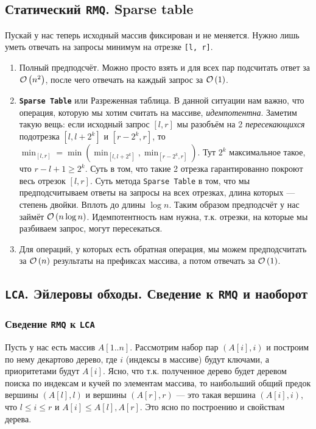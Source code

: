 \subsection{Статический \texttt{RMQ}. Sparse table}
Пускай у нас теперь исходный массив фиксирован и не меняется. Нужно лишь уметь отвечать на запросы минимум на отрезке \texttt{[l, r]}.
\begin{enumerate}[label=\arabic*.]
\item Полный предподсчёт. Можно просто взять и для всех пар подсчитать ответ за $\mathcal{O}\left(n^2\right)$, после чего отвечать на каждый запрос за $\mathcal{O}\left(1\right)$. 
\item \texttt{\textbf{Sparse Table}} или Разреженная таблица. В данной ситуации нам важно, что операция, которую мы хотим считать на массиве, \emph{идемпотентна}. Заметим такую вещь: если исходный запрос $[l, r]$ мы разобъём на 2 \emph{пересекающихся} подотрезка $[l, l + 2^k]$ и $[r - 2^k, r]$, то $\min_{[l, r]} = \min(\min_{[l, l + 2^k]}, \min_{[r - 2^k, r]})$. Тут $2^k$ максимальное такое, что $r - l + 1 \geq 2^k$. Суть в том, что такие 2 отрезка гарантированно покроют весь отрезок $[l, r]$. Суть метода \texttt{Sparse Table} в том, что мы предподсчитываем ответы на запросы на всех отрезках, длина которых --- степень двойки. Вплоть до длины $\log{n}$. Таким образом предподсчёт у нас займёт $\mathcal{O}\left(n\log{n}\right)$. Идемпотентность нам нужна, т.к. отрезки, на которые мы разбиваем запрос, могут пересекаться.
\item Для операций, у которых есть обратная операция, мы можем предподсчитать за $\mathcal{O}\left(n\right)$ результаты на префиксах массива, а потом отвечать за $\mathcal{O}\left(1\right)$.
\end{enumerate}

\subsection{\texttt{LCA}. Эйлеровы обходы. Сведение к \texttt{RMQ} и наоборот}
\subsubsection{Сведение \texttt{RMQ} к \texttt{LCA}}
Пусть у нас есть массив $A[1..n]$. Рассмотрим набор пар $(A[i], i)$ и построим по нему декартово дерево, где $i$ (индексы в массиве) будут ключами, а приоритетами будут $A[i]$. Ясно, что т.к. полученное дерево будет деревом поиска по индексам и кучей по элементам массива, то наибольший общий предок вершины $(A[l], l)$ и вершины $(A[r], r)$ --- это такая вершина $(A[i], i)$, что $l \leq i \leq r$ и $A[i] \leq A[l], A[r]$. Это ясно по построению и свойствам дерева.


